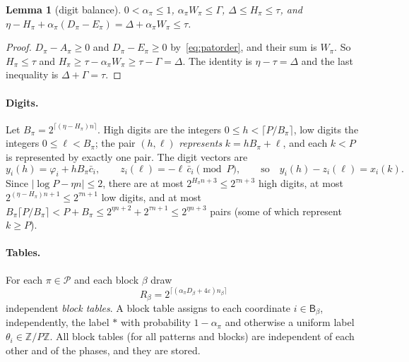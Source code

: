 \documentclass[11pt]{article}
\newtheorem{lemma}{Lemma}[section]
\theoremstyle{definition}
\newcommand{\Z}{\mathbb Z}
\newcommand{\eps}{\varepsilon}
\newcommand{\bc}{\bar c}
\newcommand{\abs}[1]{\lvert #1\rvert}
\newcommand{\ceil}[1]{\lceil #1\rceil}
\newcommand{\cP}{\mathcal P}
\begin{document}
\begin{lemma}[digit balance]\label{lem:balance}
$0<\alpha_\pi\le1$, $\alpha_\pi W_\pi\le\Gamma$, $\Delta\le H_\pi\le\tau$, and
$\eta-H_\pi+\alpha_\pi(D_\pi-E_\pi)=\Delta+\alpha_\pi W_\pi\le\tau$.
\end{lemma}
\begin{proof}
$D_\pi-A_\pi\ge0$ and $D_\pi-E_\pi\ge0$ by~\eqref{eq:patorder}, and their sum is $W_\pi$. So $H_\pi\le\tau$ and
$H_\pi\ge\tau-\alpha_\pi W_\pi\ge\tau-\Gamma=\Delta$. The identity is $\eta-\tau=\Delta$ and the last inequality is
$\Delta+\Gamma=\tau$.
\end{proof}

\paragraph{Digits.} Let $B_\pi=2^{\ceil{(\eta-H_\pi)n}}$. High digits are the integers $0\le h<\ceil{P/B_\pi}$, low
digits the integers $0\le\ell<B_\pi$; the pair $(h,\ell)$ \emph{represents} $k=hB_\pi+\ell$, and each $k<P$ is
represented by exactly one pair. The digit vectors are
\[
 y_i(h)=\varphi_i+hB_\pi\bc_i,\qquad z_i(\ell)=-\ell\,\bc_i\pmod P,\qquad\text{so}\quad y_i(h)-z_i(\ell)=x_i(k).
\]
Since $\abs{\log P-\eta n}\le2$, there are at most $2^{H_\pi n+3}\le2^{\tau n+3}$ high digits, at most
$2^{(\eta-H_\pi)n+1}\le2^{\tau n+1}$ low digits, and at most $B_\pi\ceil{P/B_\pi}<P+B_\pi\le2^{\eta n+2}+2^{\tau n+1}\le2^{\eta n+3}$ pairs (some of which represent
$k\ge P$).

\paragraph{Tables.} For each $\pi\in\cP$ and each block $\beta$ draw
\begin{equation}\label{eq:Rb}
 R_\beta=2^{\ceil{(\alpha_\pi D_\beta+4\eps)n_\beta}}
\end{equation}
independent \emph{block tables}. A block table assigns to each coordinate $i\in\mathsf B_\beta$, independently, the
label $\ast$ with probability $1-\alpha_\pi$ and otherwise a uniform label $\theta_i\in\Z/P\Z$. All block tables (for
all patterns and blocks) are independent of each other and of the phases, and they are stored.
\end{document}
